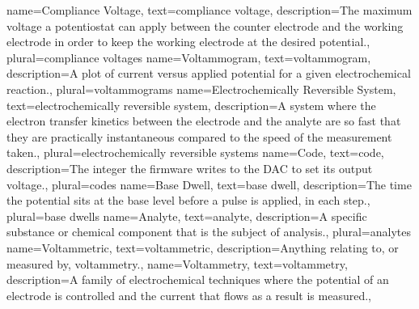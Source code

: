 {
	name=Compliance Voltage,
	text=compliance voltage,
	description={The maximum voltage a potentiostat can apply between the counter electrode and the working electrode in order to keep the working electrode at the desired potential.},
	plural=compliance voltages
}
{
	name=Voltammogram,
	text=voltammogram,
	description={A plot of current versus applied potential for a given electrochemical reaction.},
	plural=voltammograms
}
{
	name=Electrochemically Reversible System,
	text=electrochemically reversible system,
	description={A system where the electron transfer kinetics between the electrode and the analyte are so fast that they are practically instantaneous compared to the speed of the measurement taken.},
	plural=electrochemically reversible systems
}
{
	name=Code,
	text=code,
	description={The integer the firmware writes to the DAC to set its output voltage.},
	plural=codes
}
{
	name=Base Dwell,
	text=base dwell,
	description={The time the potential sits at the base level before a pulse is applied, in each step.},
	plural=base dwells
}
{
	name=Analyte,
	text=analyte,
	description={A specific substance or chemical component that is the subject of analysis.},
	plural=analytes
}
{
	name=Voltammetric,
	text=voltammetric,
	description={Anything relating to, or measured by, voltammetry.},
}
{
	name=Voltammetry,
	text=voltammetry,
	description={A family of electrochemical techniques where the potential of an electrode is controlled and the current that flows as a result is measured.},
}
